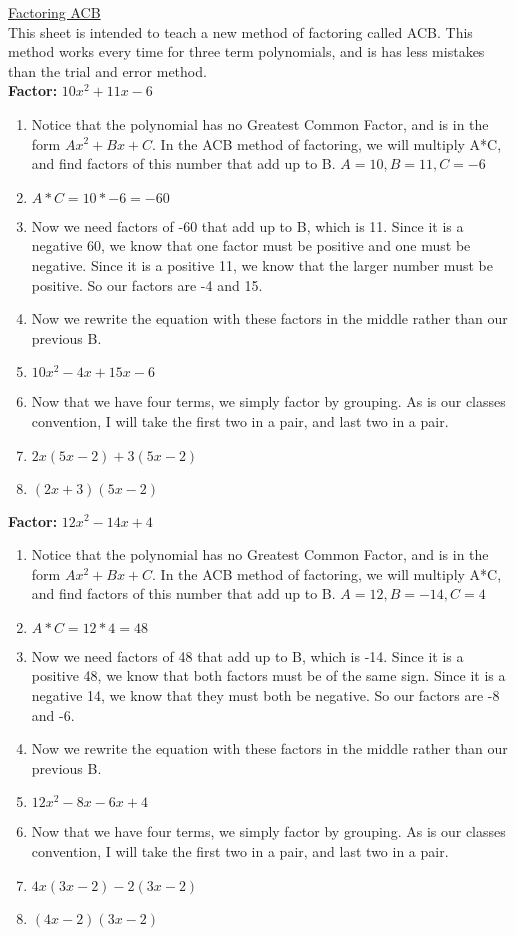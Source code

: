 \documentclass{article}
\begin{document}
\newpage
\underline{Factoring ACB}\\
This sheet is intended to teach a new method of factoring called ACB. This method works every time for three term polynomials, and is has less mistakes than the trial and error method. \\
\textbf{Factor:} $10x^{2} + 11x -6$
\begin{enumerate}
  \item Notice that the polynomial has no Greatest Common Factor, and is in the form $Ax^{2} + Bx + C$. In the ACB method of factoring, we will multiply A*C, and find factors of this number that add up to B. $A=10, B=11, C=-6$
  \item[] $A*C = 10*-6 = -60$
  \item Now we need factors of -60 that add up to B, which is 11. Since it is a negative 60, we know that one factor must be positive and one must be negative. Since it is a positive 11, we know that the larger number must be positive. So our factors are -4 and 15.
  \item Now we rewrite the equation with these factors in the middle rather than our previous B.
  \item[] $10x^{2} -4x + 15x -6$
  \item Now that we have four terms, we simply factor by grouping. As is our classes convention, I will take the first two in a pair, and last two in a pair.
  \item[] $2x(5x-2) + 3(5x-2)$
  \item[] $(2x+3)(5x-2)$
\end{enumerate}
\textbf{Factor:} $12x^{2} - 14x + 4$
\begin{enumerate}
  \item Notice that the polynomial has no Greatest Common Factor, and is in the form $Ax^{2} + Bx + C$. In the ACB method of factoring, we will multiply A*C, and find factors of this number that add up to B. $A=12, B=-14, C=4$
  \item[] $A*C = 12*4 = 48$
  \item Now we need factors of 48 that add up to B, which is -14. Since it is a positive 48, we know that both factors must be of the same sign. Since it is a negative 14, we know that they must both be negative. So our factors are -8 and -6.
  \item Now we rewrite the equation with these factors in the middle rather than our previous B.
  \item[] $12x^{2} - 8x - 6x +4$
  \item Now that we have four terms, we simply factor by grouping. As is our classes convention, I will take the first two in a pair, and last two in a pair.
  \item[] $4x(3x-2) - 2(3x-2)$
  \item[] $(4x-2)(3x-2)$
\end{enumerate}
\end{document}

